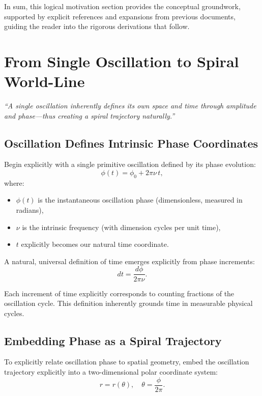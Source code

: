 In sum, this logical motivation section provides the conceptual groundwork, supported by explicit references and expansions from previous documents, guiding the reader into the rigorous derivations that follow.

\section{From Single Oscillation to Spiral World-Line}

\textit{“A single oscillation inherently defines its own space and time through amplitude and phase—thus creating a spiral trajectory naturally.”}

\subsection{Oscillation Defines Intrinsic Phase Coordinates}

Begin explicitly with a single primitive oscillation defined by its phase evolution:
\begin{equation}
    \phi(t) = \phi_0 + 2\pi\nu\,t,
\end{equation}
where:
\begin{itemize}
    \item $\phi(t)$ is the instantaneous oscillation phase (dimensionless, measured in radians),
    \item $\nu$ is the intrinsic frequency (with dimension cycles per unit time),
    \item $t$ explicitly becomes our natural time coordinate.
\end{itemize}

A natural, universal definition of time emerges explicitly from phase increments:
\begin{equation}
    dt = \frac{d\phi}{2\pi\nu}.
\end{equation}

Each increment of time explicitly corresponds to counting fractions of the oscillation cycle. This definition inherently grounds time in measurable physical cycles.

\subsection{Embedding Phase as a Spiral Trajectory}

To explicitly relate oscillation phase to spatial geometry, embed the oscillation trajectory explicitly into a two-dimensional polar coordinate system:
\begin{equation}
    r = r(\theta),\quad\theta = \frac{\phi}{2\pi}.
\end{equation}

